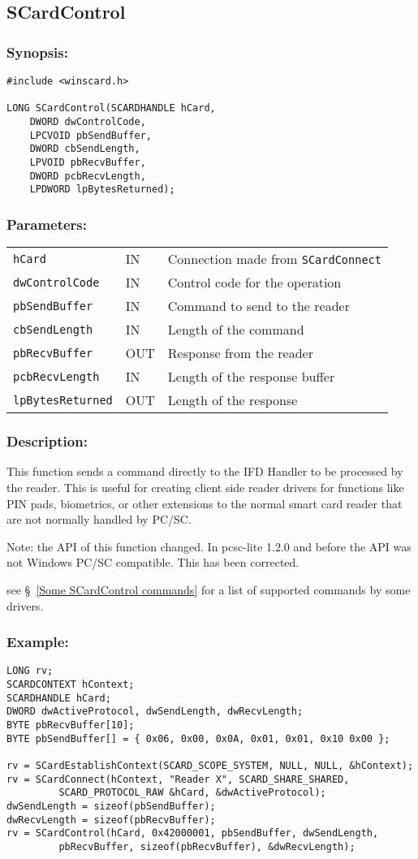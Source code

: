 \documentclass[a4paper,12pt]{article}
\newcommand{\synopsis}{\subsubsection{Synopsis:}}
\newcommand{\parameters}{\subsubsection{Parameters:}}
\newcommand{\desc}{\subsubsection{Description:}}
\newcommand{\example}{\subsubsection{Example:}}
\begin{document}
\subsection{SCardControl}

\synopsis

\begin{verbatim}
#include <winscard.h>

LONG SCardControl(SCARDHANDLE hCard,
    DWORD dwControlCode,
    LPCVOID pbSendBuffer,
    DWORD cbSendLength,
    LPVOID pbRecvBuffer,
    DWORD pcbRecvLength,
    LPDWORD lpBytesReturned);
\end{verbatim}

\parameters

\begin{tabular}{lll}
\texttt{hCard} &		IN &	Connection made from \texttt{SCardConnect}\\
\texttt{dwControlCode} & IN & Control code for the operation \\
\texttt{pbSendBuffer} &		IN &	Command to send to the reader\\
\texttt{cbSendLength} &		IN &	Length of the command\\
\texttt{pbRecvBuffer} &		OUT &	Response from the reader\\
\texttt{pcbRecvLength} &	IN &	Length of the response buffer\\
\texttt{lpBytesReturned} & OUT & Length of the response\\
\end{tabular}

\desc

This function sends a command directly to the IFD Handler to be
processed by the reader.  This is useful for creating client side reader
drivers for functions like PIN pads, biometrics, or other extensions to
the normal smart card reader that are not normally handled by PC/SC.

Note: the API of this function changed. In pcsc-lite 1.2.0 and before
the API was not Windows{\textregistered} PC/SC compatible. This has been
corrected.

see \S~\ref{Some SCardControl commands} for a list of supported commands
by some drivers.

\example

\begin{verbatim}
LONG rv;
SCARDCONTEXT hContext;
SCARDHANDLE hCard;
DWORD dwActiveProtocol, dwSendLength, dwRecvLength;
BYTE pbRecvBuffer[10];
BYTE pbSendBuffer[] = { 0x06, 0x00, 0x0A, 0x01, 0x01, 0x10 0x00 };

rv = SCardEstablishContext(SCARD_SCOPE_SYSTEM, NULL, NULL, &hContext);
rv = SCardConnect(hContext, "Reader X", SCARD_SHARE_SHARED,
         SCARD_PROTOCOL_RAW &hCard, &dwActiveProtocol);
dwSendLength = sizeof(pbSendBuffer);
dwRecvLength = sizeof(pbRecvBuffer);
rv = SCardControl(hCard, 0x42000001, pbSendBuffer, dwSendLength,
         pbRecvBuffer, sizeof(pbRecvBuffer), &dwRecvLength);
\end{verbatim}
\end{document}
